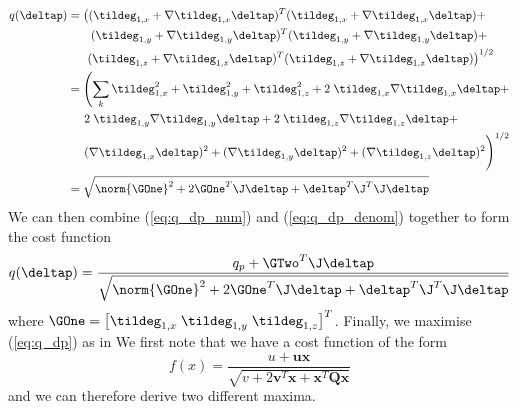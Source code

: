 \begin{equation}
  \begin{aligned}\label{eq:q_dp_denom}
    q(\deltap) &= \left( (\tildeg_{1,x} + \nabla \tildeg_{1,x} \deltap)^T (\tildeg_{1,x} + \nabla \tildeg_{1,x} \deltap) + \right. \\
    & \hspace{6 mm} \left. (\tildeg_{1,y} + \nabla \tildeg_{1,y} \deltap)^T (\tildeg_{1,y} + \nabla \tildeg_{1,y} \deltap) + \right. \\
    & \hspace{5 mm} \left. (\tildeg_{1,z} + \nabla \tildeg_{1,z} \deltap)^T (\tildeg_{1,z} + \nabla \tildeg_{1,z} \deltap) \right)^{1/2} \\
    &= \left( \sum_k \tildeg^2_{1,x} + \tildeg^2_{1,y} + \tildeg^2_{1,z} + 2 \; \tildeg_{1,x} \nabla \tildeg_{1,x} \deltap + \right. \\
    & \hspace{4 mm} \left. 2 \; \tildeg_{1,y} \nabla \tildeg_{1,y} \deltap + 2 \; \tildeg_{1,z} \nabla \tildeg_{1,z} \deltap + \right. \\
    & \hspace{4 mm} \left. \vphantom{\sum_k} (\nabla \tildeg_{1,x} \deltap)^2 + (\nabla \tildeg_{1,y} \deltap)^2 +(\nabla \tildeg_{1,z} \deltap)^2 \right)^{1/2} \\
    &= \sqrt{\norm{\GOne}^2 + 2 \GOne^T \J \deltap + \deltap^T \J^T \J \deltap}
  \end{aligned}
\end{equation}
We can then combine (\ref{eq:q_dp_num}) and (\ref{eq:q_dp_denom}) together to form the cost function
\begin{equation}\label{eq:q_dp}
    q(\deltap) = \frac{q_p + \GTwo^T \J \deltap}{\sqrt{\norm{\GOne}^2 + 2 \GOne^T \J \deltap + \deltap^T \J^T \J \deltap}}
\end{equation}
where $\GOne = \left[ \tildeg_{1,x} \; \tildeg_{1,y} \; \tildeg_{1,z} \right]^T$. Finally, we maximise (\ref{eq:q_dp}) as in \cite{RefWorks:59} We first note that we have a cost function of the form
\begin{equation*}
    f(x) = \frac{u + \boldsymbol{u}\boldsymbol{x}}{\sqrt{v + 2 \boldsymbol{v}^T \boldsymbol{x} + \boldsymbol{x}^T  \boldsymbol{Q} \boldsymbol{x}}}
\end{equation*}
and we can therefore derive two different maxima. 

